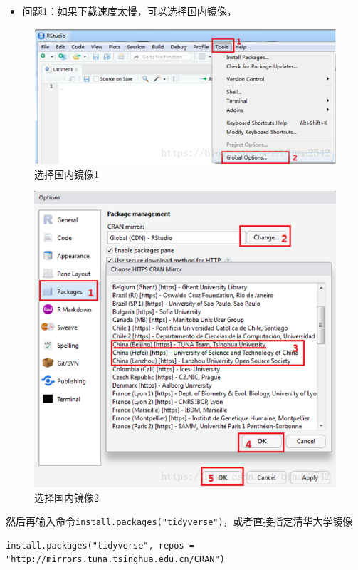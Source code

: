 \documentclass[
]{book}
\providecommand{\tightlist}{%
  \setlength{\itemsep}{0pt}\setlength{\parskip}{0pt}}
\begin{document}
\begin{itemize}
\tightlist
\item
  问题1：如果下载速度太慢，可以选择国内镜像，
\end{itemize}

\begin{figure}
\centering
\includegraphics{figure/16.png}
\caption{选择国内镜像1}
\end{figure}

\begin{figure}
\centering
\includegraphics{figure/17.png}
\caption{选择国内镜像2}
\end{figure}

然后再输入命令\texttt{install.packages("tidyverse")}，或者直接指定清华大学镜像

\begin{verbatim}
install.packages("tidyverse", repos = "http://mirrors.tuna.tsinghua.edu.cn/CRAN")
\end{verbatim}
\end{document}
